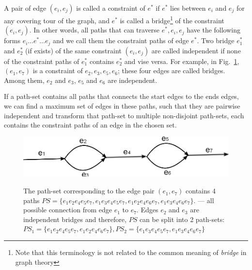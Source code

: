 \documentclass[12pt,a4paper,oneside]{article}
\begin{document}
A pair of edge $(e_i, e_j)$ is called a constraint of $e^*$ if $e^*$ lies between $e_i$ and $e_j$ for any 
covering tour of the graph, and $e^*$ is called a bridge\footnote{Note that this terminology is not related to the 
common meaning of \emph{bridge} in graph theory} of the constraint $(e_i, e_j)$.
In other words, all paths that can traverse $e^*, e_i, e_j$  have the following forms $e_i \ldots e^* \ldots e_j$ and we call them the constraint paths of edge $e^*$. 
Two bridge $e^*_1$   and $e^*_2$ (if exists) of the same constraint $(e_i, e_j)$ are called independent  if none of the constraint paths of $e^*_1$ 
contains $e^*_2$ and vise versa. For example, in Fig.~\ref{fig:bridge}, $(e_1,e_7)$ is a constraint of $e_2, e_3, e_5, e_6$; these four edges are called bridges. Among
them, $e_2$ and $e_3$, $e_5$ and $e_6$ are independent. 

If a path-set contains all paths that connects the start edges to the ends edges, we can find a maximum set of edges in these paths, such that they are pairwise independent and 
transform that path-set to multiple non-disjoint path-sets, each contains the constraint paths of an edge in the chosen set. 
\begin{figure}
    \begin{center}
    \includegraphics[scale =1] {fig/bridge.eps}
    \label{fig:bridge}
    \caption{ The path-set corresponding to the edge pair $(e_1, e_7)$ contains 4 paths $PS= \{e_1e_2e_4e_5e_7,e_1e_3e_4e_5e_7, e_1e_2e_4e_6e_7, e_1e_3e_4e_6e_7\}$. 
        --- all possible connection from edge $e_1$ to $e_7$. Edges $e_2$ and $e_3$ are independent bridges and therefore, $PS$ can be split into 2 path-sets: 
    $PS_1 =\{ e_1e_2e_4e_5e_7, e_1e_2e_4e_6e_7 \},  PS_2 =\{ e_1e_3e_4e_5e_7, e_1e_3e_4e_6e_7 \}$ }
    \end{center}
\end{figure}
\end{document}
